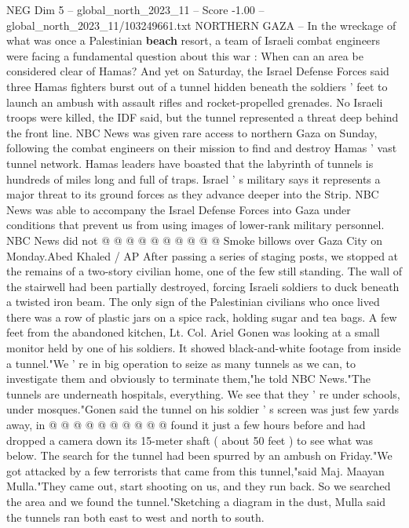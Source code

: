 \begin{textsample}{NEG Dim 5 – global\_north\_2023\_11 – Score -1.00 – global\_north\_2023\_11/103249661.txt}  \label{ex:f5_neg_049}
NORTHERN GAZA -- In the wreckage of what was once a Palestinian \textbf{beach} resort, a team of Israeli combat engineers were facing a fundamental question about this war : When can an area be considered clear of Hamas?
And yet on Saturday, the Israel Defense Forces said three Hamas fighters burst out of a tunnel hidden beneath the soldiers ' feet to launch an ambush with assault rifles and rocket-propelled grenades.
No Israeli troops were killed, the IDF said, but the tunnel represented a threat deep behind the front line.
NBC News was given rare access to northern Gaza on Sunday, following the combat engineers on their mission to find and destroy Hamas ' vast tunnel network.
Hamas leaders have boasted that the labyrinth of tunnels is hundreds of miles long and full of traps.
Israel ' s military says it represents a major threat to its ground forces as they advance deeper into the Strip.
NBC News was able to accompany the Israel Defense Forces into Gaza under conditions that prevent us from using images of lower-rank military personnel.
NBC News did not @ @ @ @ @ @ @ @ @ @ Smoke billows over Gaza City on Monday.Abed Khaled / AP After passing a series of staging posts, we stopped at the remains of a two-story civilian home, one of the few still standing.
The wall of the stairwell had been partially destroyed, forcing Israeli soldiers to duck beneath a twisted iron beam.
The only sign of the Palestinian civilians who once lived there was a row of plastic jars on a spice rack, holding sugar and tea bags.
A few feet from the abandoned kitchen, Lt.
Col.
Ariel Gonen was looking at a small monitor held by one of his soldiers.
It showed black-and-white footage from inside a tunnel."We ' re in big operation to seize as many tunnels as we can, to investigate them and obviously to terminate them,"he told NBC News."The tunnels are underneath hospitals, everything.
We see that they ' re under schools, under mosques."Gonen said the tunnel on his soldier ' s screen was just few yards away, in @ @ @ @ @ @ @ @ @ @ found it just a few hours before and had dropped a camera down its 15-meter shaft ( about 50 feet ) to see what was below.
The search for the tunnel had been spurred by an ambush on Friday."We got attacked by a few terrorists that came from this tunnel,"said Maj.
Maayan Mulla."They came out, start shooting on us, and they run back.
So we searched the area and we found the tunnel."Sketching a diagram in the dust, Mulla said the tunnels ran both east to west and north to south.

\end{textsample}
